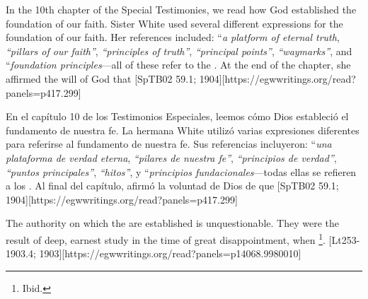  \label{chap:authority}


 \label{chap:authority}


In the 10th chapter of the Special Testimonies, we read how God established the foundation of our faith. Sister White used several different expressions for the foundation of our faith. Her references included: “\textit{a platform of eternal truth}, \textit{“pillars of our faith”}, \textit{“principles of truth”}, \textit{“principal points”}, \textit{“waymarks”}, and “\textit{foundation principles}—all of these refer to the . At the end of the chapter, she affirmed the will of God that [SpTB02 59.1; 1904][https://egwwritings.org/read?panels=p417.299]


En el capítulo 10 de los Testimonios Especiales, leemos cómo Dios estableció el fundamento de nuestra fe. La hermana White utilizó varias expresiones diferentes para referirse al fundamento de nuestra fe. Sus referencias incluyeron: “\textit{una plataforma de verdad eterna}, \textit{“pilares de nuestra fe”}, \textit{“principios de verdad”}, \textit{“puntos principales”}, \textit{“hitos”}, y “\textit{principios fundacionales}—todas ellas se refieren a los . Al final del capítulo, afirmó la voluntad de Dios de que [SpTB02 59.1; 1904][https://egwwritings.org/read?panels=p417.299]


The authority on which the  are established is unquestionable. They were the result of deep, earnest study in the time of great disappointment, when \footnote{Ibid.}. [Lt253-1903.4; 1903][https://egwwritings.org/read?panels=p14068.9980010]


